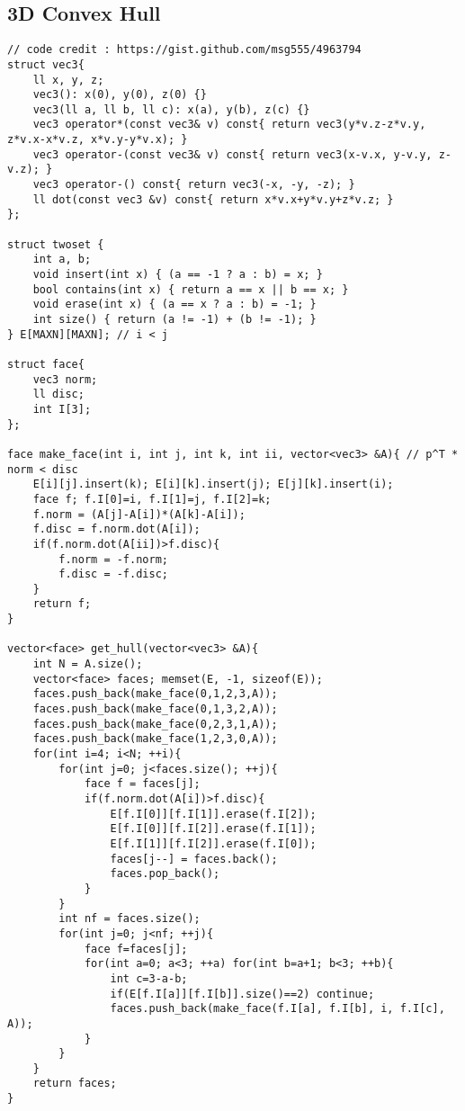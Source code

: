 \documentclass[landscape, 8pt, a4paper, oneside,  twocolumn]{extarticle}
\begin{document}
\subsection{3D Convex Hull}
\begin{verbatim}
// code credit : https://gist.github.com/msg555/4963794
struct vec3{
	ll x, y, z;
	vec3(): x(0), y(0), z(0) {}
	vec3(ll a, ll b, ll c): x(a), y(b), z(c) {}
	vec3 operator*(const vec3& v) const{ return vec3(y*v.z-z*v.y, z*v.x-x*v.z, x*v.y-y*v.x); }
	vec3 operator-(const vec3& v) const{ return vec3(x-v.x, y-v.y, z-v.z); }
	vec3 operator-() const{ return vec3(-x, -y, -z); }
	ll dot(const vec3 &v) const{ return x*v.x+y*v.y+z*v.z; }
};

struct twoset {
	int a, b;
	void insert(int x) { (a == -1 ? a : b) = x; }
	bool contains(int x) { return a == x || b == x; }
	void erase(int x) { (a == x ? a : b) = -1; }
	int size() { return (a != -1) + (b != -1); }
} E[MAXN][MAXN]; // i < j

struct face{ 
	vec3 norm;
	ll disc;
	int I[3];
};

face make_face(int i, int j, int k, int ii, vector<vec3> &A){ // p^T * norm < disc
	E[i][j].insert(k); E[i][k].insert(j); E[j][k].insert(i);
	face f; f.I[0]=i, f.I[1]=j, f.I[2]=k;
	f.norm = (A[j]-A[i])*(A[k]-A[i]);
	f.disc = f.norm.dot(A[i]);
	if(f.norm.dot(A[ii])>f.disc){
		f.norm = -f.norm;
		f.disc = -f.disc;
	}
	return f;
}

vector<face> get_hull(vector<vec3> &A){
	int N = A.size();
	vector<face> faces; memset(E, -1, sizeof(E));
	faces.push_back(make_face(0,1,2,3,A));
	faces.push_back(make_face(0,1,3,2,A));
	faces.push_back(make_face(0,2,3,1,A));
	faces.push_back(make_face(1,2,3,0,A));
	for(int i=4; i<N; ++i){
		for(int j=0; j<faces.size(); ++j){
			face f = faces[j];
			if(f.norm.dot(A[i])>f.disc){
				E[f.I[0]][f.I[1]].erase(f.I[2]);
				E[f.I[0]][f.I[2]].erase(f.I[1]);
				E[f.I[1]][f.I[2]].erase(f.I[0]);
				faces[j--] = faces.back();
				faces.pop_back();
			}
		}
		int nf = faces.size();
		for(int j=0; j<nf; ++j){
			face f=faces[j];
			for(int a=0; a<3; ++a) for(int b=a+1; b<3; ++b){
				int c=3-a-b;
				if(E[f.I[a]][f.I[b]].size()==2) continue;
				faces.push_back(make_face(f.I[a], f.I[b], i, f.I[c], A));
			}
		}
	}
	return faces;
}
\end{verbatim}
\end{document}
